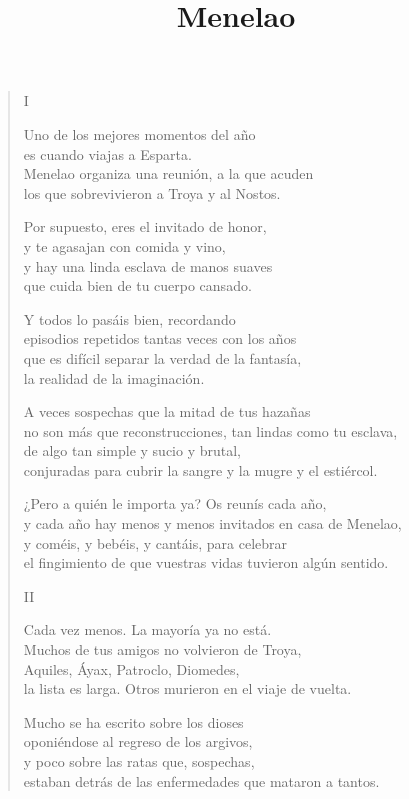 \documentclass[11pt,a4paper]{article}
\title{Menelao}
\author{}
\date{}
\begin{document}
\maketitle

\begin{verse}
I

Uno de los mejores momentos del año\\
es cuando viajas a Esparta.\\
Menelao organiza una reunión, a la que acuden\\
los que sobrevivieron a Troya y al Nostos.

Por supuesto, eres el invitado de honor,\\
y te agasajan con comida y vino,\\
y hay una linda esclava de manos suaves\\
que cuida bien de tu cuerpo cansado.

Y todos lo pasáis bien, recordando\\
episodios repetidos tantas veces con los años\\
que es difícil separar la verdad de la fantasía,\\
la realidad de la imaginación.

A veces sospechas que la mitad de tus hazañas\\
no son más que reconstrucciones, tan lindas como tu esclava,\\
de algo tan simple y sucio y brutal,\\
conjuradas para cubrir la sangre y la mugre y el estiércol.

¿Pero a quién le importa ya? Os reunís cada año,\\
y cada año hay menos y menos invitados en casa de Menelao,\\
y coméis, y bebéis, y cantáis, para celebrar\\
el fingimiento de que vuestras vidas tuvieron algún sentido.

II

Cada vez menos. La mayoría ya no está.\\
Muchos de tus amigos no volvieron de Troya,\\
Aquiles, Áyax, Patroclo, Diomedes,\\
la lista es larga. Otros murieron en el viaje de vuelta.

Mucho se ha escrito sobre los dioses\\
oponiéndose al regreso de los argivos,\\
y poco sobre las ratas que, sospechas,\\
estaban detrás de las enfermedades que mataron a tantos.


\end{verse}
\end{document}
